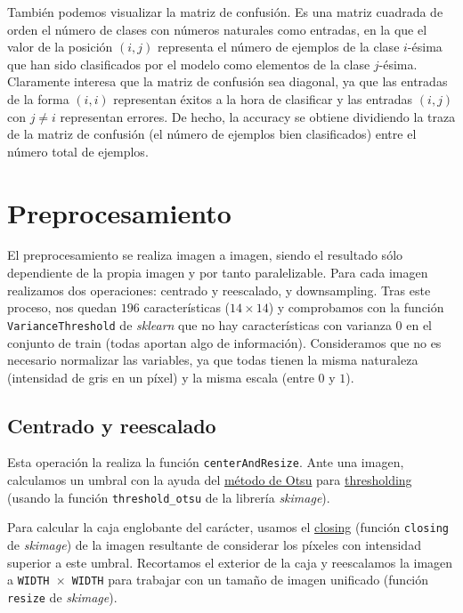 \documentclass[a4]{article}
\begin{document}
También podemos visualizar la matriz de confusión. Es una matriz
cuadrada de orden el número de clases con números naturales como
entradas, en la que el valor de la posición $(i, j)$ representa el
número de ejemplos de la clase $i$-ésima que han sido clasificados por
el modelo como elementos de la clase $j$-ésima. Claramente interesa
que la matriz de confusión sea diagonal, ya que las entradas de la
forma $(i, i)$ representan éxitos a la hora de clasificar y las
entradas $(i, j)$ con $j \neq i$ representan errores. De hecho, la
accuracy se obtiene dividiendo la traza de la matriz de confusión (el
número de ejemplos bien clasificados) entre el número total de
ejemplos.

\section{Preprocesamiento}

El preprocesamiento se realiza
imagen a imagen, siendo el resultado sólo dependiente de la propia
imagen y por tanto paralelizable. Para cada imagen realizamos dos operaciones: centrado y reescalado, y downsampling. Tras este proceso, nos quedan $196$ características ($14 \times 14$) y comprobamos con la función \texttt{VarianceThreshold} de \textit{sklearn} que no hay características con varianza $0$ en el conjunto de train (todas aportan algo de información). Consideramos que no es necesario normalizar las variables, ya que todas tienen la misma naturaleza (intensidad de gris en un píxel) y la misma escala (entre $0$ y $1$).

\subsection{Centrado y reescalado}

Esta operación la realiza la función \texttt{centerAndResize}. Ante
una imagen, calculamos un umbral con la ayuda del \href{https://en.wikipedia.org/wiki/Otsu%27s_method}{método de Otsu}
  para
\href{https://en.wikipedia.org/wiki/Thresholding_(image_processing)}{thresholding} (usando la función \texttt{threshold\_otsu} de la librería \textit{skimage}). 

Para calcular la caja englobante del carácter, usamos el
\href{https://en.wikipedia.org/wiki/Closing_%28morphology%29}{closing}
  (función \texttt{closing} de \textit{skimage}) de la imagen
  resultante de considerar los píxeles con intensidad superior a este
  umbral. Recortamos el exterior de la caja y reescalamos la imagen a
  \texttt{WIDTH $\times$ WIDTH} para trabajar con un tamaño de imagen
  unificado (función \texttt{resize} de \textit{skimage}).
\end{document}
